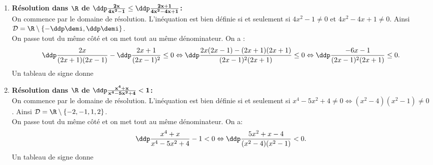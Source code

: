 \begin{correction}
\begin{enumerate}
\item \textbf{R\'esolution dans $\mathbf{\R}$ de $\mathbf{\ddp\frac{2x}{4x^2-1}\leq \ddp\frac{2x+1}{4x^2-4x+1}}$:}\\
\noindent On commence par le domaine de r\'esolution. L'in\'equation est bien d\'efinie si et seulement si $4x^2-1\not= 0$ et $4x^2-4x+1\not= 0$. Ainsi $\mathcal{D}=\R\setminus\left\lbrace -\ddp\demi,\ddp\demi\right\rbrace$.\\
\noindent On passe tout du m\^{e}me c\^{o}t\'e et on met tout au m\^{e}me d\'enominateur. 
On a :
$$\ddp\frac{2x}{(2x+1)(2x-1)}-\ddp\frac{2x+1}{(2x-1)^2}\leq 0 \Leftrightarrow \ddp\frac{ 2x(2x-1)-(2x+1)(2x+1)  }{(2x-1)^2(2x+1)}\leq 0 \Leftrightarrow \ddp\frac{ -6x-1  }{(2x-1)^2(2x+1)}\leq 0.$$ 
Un tableau de signe donne 
\item \textbf{R\'esolution dans $\mathbf{\R}$ de $\mathbf{ \ddp\frac{x^4+x}{x^4-5x^2+4}<1}$:}\\
\noindent On commence par le domaine de r\'esolution. L'in\'equation est bien d\'efinie si et seulement si $x^4-5x^2+4\not= 0\Leftrightarrow (x^2-4)(x^2-1)\not= 0$. Ainsi $\mathcal{D}=\R\setminus\left\lbrace -2,-1,1,2\right\rbrace$.\\
\noindent On passe tout du m\^{e}me c\^{o}t\'e et on met tout au m\^{e}me d\'enominateur. On a: 
$$\ddp\frac{x^4+x}{x^4-5x^2+4}-1<0\Leftrightarrow \ddp\frac{5x^2+x-4}{(x^2-4)(x^2-1)}<0.$$ 
Un tableau de signe donne 


\end{enumerate}
\end{correction}
